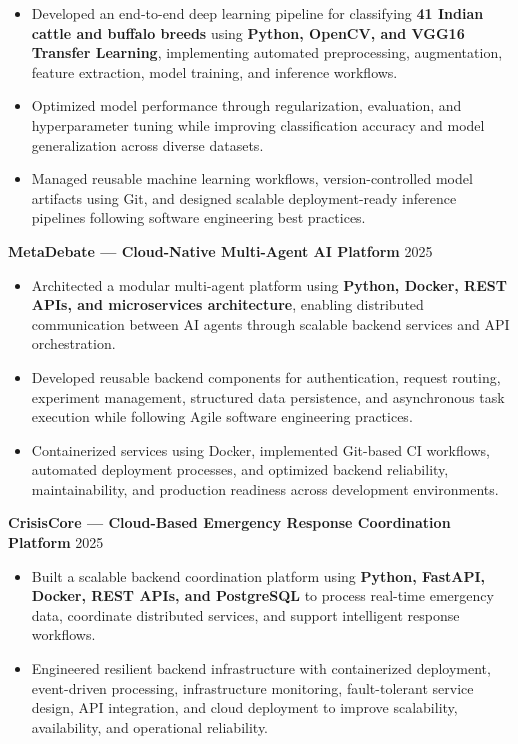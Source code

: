 \documentclass[9pt]{article}
\begin{document}
\begin{itemize}
    \item Developed an end-to-end deep learning pipeline for classifying \textbf{41 Indian cattle and buffalo breeds} using \textbf{Python, OpenCV, and VGG16 Transfer Learning}, implementing automated preprocessing, augmentation, feature extraction, model training, and inference workflows.
    
    \item Optimized model performance through regularization, evaluation, and hyperparameter tuning while improving classification accuracy and model generalization across diverse datasets.
    
    \item Managed reusable machine learning workflows, version-controlled model artifacts using Git, and designed scalable deployment-ready inference pipelines following software engineering best practices.
\end{itemize}

\textbf{MetaDebate --- Cloud-Native Multi-Agent AI Platform} \hfill 2025

\begin{itemize}

\item Architected a modular multi-agent platform using \textbf{Python, Docker, REST APIs, and microservices architecture}, enabling distributed communication between AI agents through scalable backend services and API orchestration.

\item Developed reusable backend components for authentication, request routing, experiment management, structured data persistence, and asynchronous task execution while following Agile software engineering practices.

\item Containerized services using Docker, implemented Git-based CI workflows, automated deployment processes, and optimized backend reliability, maintainability, and production readiness across development environments.

\end{itemize}

\textbf{CrisisCore --- Cloud-Based Emergency Response Coordination Platform} \hfill 2025

\begin{itemize}

\item Built a scalable backend coordination platform using \textbf{Python, FastAPI, Docker, REST APIs, and PostgreSQL} to process real-time emergency data, coordinate distributed services, and support intelligent response workflows.

\item Engineered resilient backend infrastructure with containerized deployment, event-driven processing, infrastructure monitoring, fault-tolerant service design, API integration, and cloud deployment to improve scalability, availability, and operational reliability.

\end{itemize}
\end{document}
